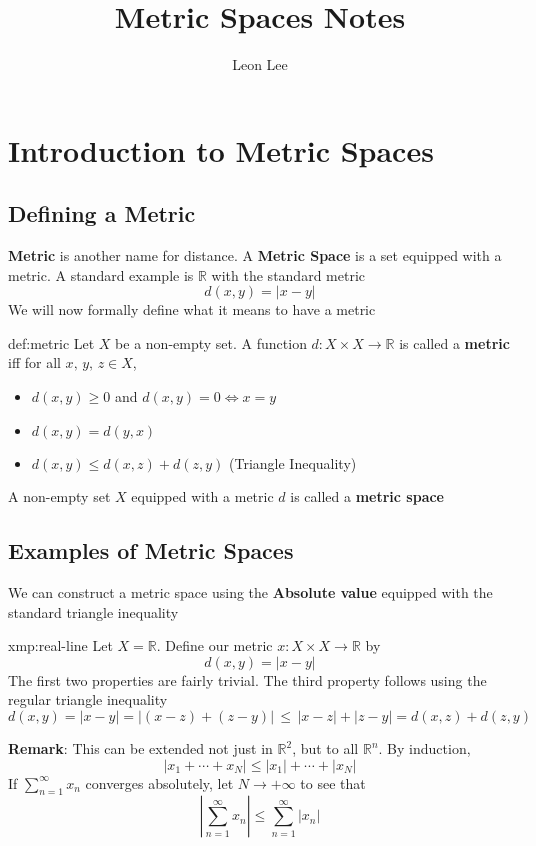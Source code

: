 \documentclass{article}
\title{Metric Spaces Notes}
\author{Leon Lee}
\begin{document}
\maketitle
\newpage
\tableofcontents
\newpage

\section{Introduction to Metric Spaces}
\subsection{Defining a Metric}
\textbf{Metric} is another name for distance. A \textbf{Metric Space} is a set equipped with a metric.
A standard example is $\mathbb{R}$ with the standard metric
\[d(x,y) = \lvert x-y \rvert\]
We will now formally define what it means to have a metric

\begin{thm}{def:metric}{}
    Let $X$ be a non-empty set. A function $d: X \times X \to \mathbb{R} $ is called a \textbf{metric} iff for all $x,\,y,\,z\in X$,
    \begin{itemize}
        \item $d(x,y)\ge 0$ and $d(x,y)=0 \iff x = y$
        \item $d(x,y)=d(y,x)$
        \item $d(x,y)\le d(x,z)+d(z,y)$ (Triangle Inequality)
    \end{itemize}
    A non-empty set $X$ equipped with a metric $d$ is called a \textbf{metric space}
\end{thm}

\subsection{Examples of Metric Spaces}
We can construct a metric space using the \textbf{Absolute value} equipped with the standard triangle inequality
\begin{xmp}{xmp:real-line}{}
    Let $X = \mathbb{R}$. Define our metric $x: X \times X \to \mathbb{R} $ by
    \[d(x,y)=\lvert x-y \rvert\]
    The first two properties are fairly trivial. The third property follows using the regular triangle inequality
    \[d(x,y) = \lvert x - y \rvert = \lvert (x - z) + (z - y) \rvert \,\le\, \lvert x - z \rvert + \lvert z - y \rvert = d(x,z) + d(z,y)\]
\end{xmp}

\textbf{Remark}: This can be extended not just in $\mathbb{R}^{2}$, but to all $\mathbb{R}^{n}$. By induction,
\[\lvert x_{1} + \cdots + x_{N} \rvert \le \lvert x_{1} \rvert + \cdots + \lvert x_{N} \rvert\]
If $\displaystyle\sum_{n = 1}^{\infty}x_{n}$ converges absolutely, let $N\to +\infty$ to see that
\[\left\lvert \sum_{n = 1}^{\infty}x_{n} \right\rvert \le \sum_{n = 1}^{\infty} \lvert x_{n} \rvert\]
\end{document}
